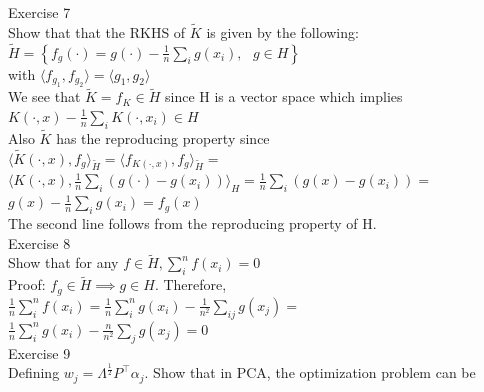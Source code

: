 \documentclass[18pt]{article}
\begin{document}
\begin{flushleft}
\vspace{.4cm}
Exercise 7\\
\vspace{.4cm}
Show that that the RKHS of $\tilde{K}$ is given by the following:\\
\vspace{.4cm}
$\tilde{H}=\left\{f_g(\cdot)=g(\cdot)-\frac{1}{n}\sum\limits_i g(x_i),\text{ }g\in H \right\}$\\
\vspace{.4cm}
with $\langle f_{g_1},f_{g_2}\rangle=\langle g_1,g_2\rangle$\\
\vspace{.4cm}
We see that $\tilde{K}=f_K \in \tilde{H}$ since H is a vector space which implies\\
\vspace{.4cm}
$K(\cdot,x)-\frac{1}{n} \sum\limits_i K(\cdot,x_i) \in H$\\
Also $\tilde{K}$ has the reproducing property since\\
\vspace{.4cm}
$\langle \tilde{K}(\cdot,x),f_g \rangle_{\tilde{H}}= \langle f_{K(\cdot,x)},f_g \rangle_{\tilde{H}}=$\\
$\langle K(\cdot,x),\frac{1}{n}\sum\limits_i(g(\cdot)-g(x_i))\rangle_H=\frac{1}{n}\sum\limits_i (g(x)-g(x_i))=$\\
$g(x)-\frac{1}{n} \sum\limits_i g(x_i)=f_g(x)$\\
\vspace{.4cm}
The second line follows from the reproducing property of H.\\
\vspace{.4cm}
Exercise 8\\
\vspace{.4cm}
Show that for any $f\in \tilde{H}, \sum\limits_i^n f(x_i)=0$\\
\vspace{.4cm}
Proof: $f_g \in \tilde{H} \implies g\in H$. Therefore,\\
\vspace{.4cm}
$\frac{1}{n} \sum\limits_i^n f(x_i)=\frac{1}{n} \sum\limits_i^n g(x_i)-\frac{1}{n^2}\sum\limits_{ij} g(x_j)=$\\
$\frac{1}{n} \sum\limits_i^n g(x_i)-\frac{n}{n^2}\sum\limits_j g(x_j)=0$\\
\vspace{.4cm}
Exercise 9\\
\vspace{.4cm}
Defining $w_j=\Lambda^{\frac{1}{2}} P^{\top} \alpha_j$. Show that in PCA, the optimization problem can be\\

\end{flushleft}
\end{document}
